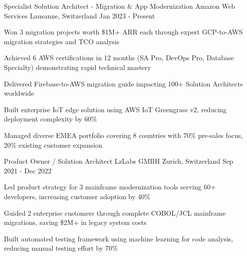 \vspace{-1mm}

\begin{cventries}
    \cventry
    {Specialist Solution Architect - Migration \& App Modernization} %
    {Amazon Web Services} %
    {Lausanne, Switzerland} %
    {Jan 2023 - Present} %
    {
        \begin{cvitems} %
		\item {Won 3 migration projects worth \$1M+ ARR each through expert GCP-to-AWS migration strategies and TCO analysis}
		\item {Achieved 6 AWS certifications in 12 months (SA Pro, DevOps Pro, Database Specialty) demonstrating rapid technical mastery}
		\item {Delivered Firebase-to-AWS migration guide impacting 100+ Solution Architects worldwide}
		\item {Built enterprise IoT edge solution using AWS IoT Greengrass v2, reducing deployment complexity by 60\%}
		\item {Managed diverse EMEA portfolio covering 8 countries with 70\% pre-sales focus, 20\% existing customer expansion}
        \end{cvitems}
    }
    \cventry
    {Product Owner / Solution Architect} %
    {LzLabs GMBH} %
    {Zurich, Switzerland} %
    {Sep 2021 - Dec 2022} %
    {
        \begin{cvitems} %
            \item{Led product strategy for 3 mainframe modernization tools serving 60+ developers, increasing customer adoption by 40\%}
            \item{Guided 2 enterprise customers through complete COBOL/JCL mainframe migrations, saving \$2M+ in legacy system costs}
            \item{Built automated testing framework using machine learning for code analysis, reducing manual testing effort by 70\%}

\end{cvitems}}
\end{cventries}
